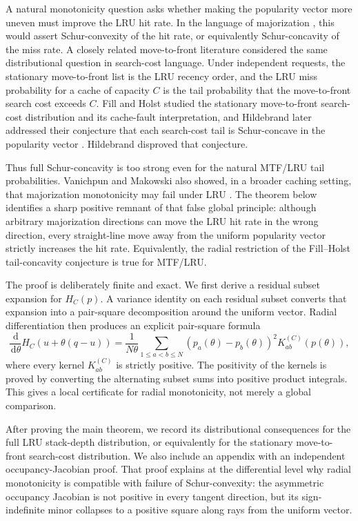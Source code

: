 \documentclass[11pt]{article}
\theoremstyle{remark}
\newcommand{\dd}{\,\mathrm{d}}
\begin{document}
A natural monotonicity question asks whether making the popularity vector
more uneven must improve the LRU hit rate.  In the language of
majorization \cite{MarshallOlkinArnold2011}, this would assert
Schur-convexity of the hit rate, or equivalently Schur-concavity of the
miss rate.  A closely related move-to-front literature considered the
same distributional question in search-cost language.  Under independent
requests, the stationary move-to-front list is the LRU recency order, and
the LRU miss probability for a cache of capacity $C$ is the tail
probability that the move-to-front search cost exceeds $C$.  Fill and
Holst studied the stationary move-to-front search-cost distribution and
its cache-fault interpretation, and Hildebrand later addressed their
conjecture that each search-cost tail is Schur-concave in the popularity
vector \cite{FillHolst1996,Hildebrand1999}.  Hildebrand disproved that
conjecture.

Thus full Schur-concavity is too strong even for the natural MTF/LRU tail
probabilities.  Vanichpun and Makowski also showed, in a broader caching
setting, that majorization monotonicity may fail under LRU
\cite{VanichpunMakowski2004,MakowskiVanichpun2005}.  The theorem below
identifies a sharp positive remnant of that false global principle:
although arbitrary majorization directions can move the LRU hit rate in
the wrong direction, every straight-line move away from the uniform
popularity vector strictly increases the hit rate.  Equivalently, the
radial restriction of the Fill--Holst tail-concavity conjecture is true
for MTF/LRU\@.

The proof is deliberately finite and exact.  We first derive a residual
subset expansion for $H_C(p)$.  A variance identity on each residual
subset converts that expansion into a pair-square decomposition around
the uniform vector.  Radial differentiation then produces an explicit
pair-square formula
\[
        \frac{\dd}{\dd\theta}H_C(u+\theta(q-u))
        =
        \frac{1}{N\theta}
        \sum_{1\le a<b\le N}
        (p_a(\theta)-p_b(\theta))^2 K_{ab}^{(C)}(p(\theta)),
\]
where every kernel $K_{ab}^{(C)}$ is strictly positive.  The positivity
of the kernels is proved by converting the alternating subset sums into
positive product integrals.  This gives a local certificate for radial
monotonicity, not merely a global comparison.

After proving the main theorem, we record its distributional
consequences for the full LRU stack-depth distribution, or equivalently
for the stationary move-to-front search-cost distribution.  We also
include an appendix with an independent occupancy-Jacobian proof.  That
proof explains at the differential level why radial monotonicity is
compatible with failure of Schur-convexity: the asymmetric occupancy
Jacobian is not positive in every tangent direction, but its
sign-indefinite minor collapses to a positive square along rays from the
uniform vector.
\end{document}
